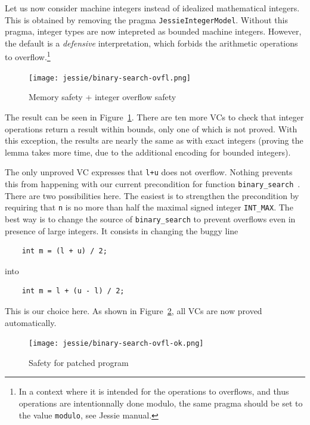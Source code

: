 \documentclass[a4paper,11pt,twoside,openright]{report}
\newcommand{\negtenthspace}{\hspace*{-0.1\linewidth}}
\begin{document}
Let us now consider machine integers instead of idealized mathematical
integers. This is obtained by removing the pragma
\texttt{JessieIntegerModel}.  Without this pragma, integer types are
now intepreted as bounded machine integers. However, the default is a
\emph{defensive} interpretation, which forbids the arithmetic
operations to overflow.\footnote{In a context where it is intended for
  the operations to overflows, and thus operations are intentionnally
  done modulo, the same pragma should be set to the value
  \texttt{modulo}, see Jessie manual.}

\begin{figure}[t]
  \begin{center}
    \negtenthspace\texttt{[image: jessie/binary-search-ovfl.png]}
  \end{center}
  \caption{Memory safety + integer overflow safety}
  \label{fig:ovfl}
  \hrulefill
\end{figure}

The result can be seen in Figure~\ref{fig:ovfl}. There are ten more VCs
to check that integer operations return a result within bounds, only one of
which is not proved. With this exception, the results are nearly the same
as with exact integers (proving the lemma takes more time, due
to the additional encoding for bounded integers).

The only unproved VC expresses that \verb|l+u| does not overflow. 
Nothing prevents this from happening with our current
precondition for function \verb|binary_search|~\cite{Tuch_KN_07}. There are two
possibilities here. The easiest is to strengthen the precondition
by requiring that \verb|n| is no more than half the maximal signed
integer \verb|INT_MAX|. The best way is to change the source of
\verb|binary_search| to prevent overflows even in presence of large
integers. It consists in changing the buggy line

\begin{verbatim}
    int m = (l + u) / 2;
\end{verbatim}

into

\begin{verbatim}
    int m = l + (u - l) / 2;
\end{verbatim}

This is our choice here. As shown in Figure~\ref{fig:ovfl-ok}, all VCs
are now proved automatically.

\begin{figure}[t]
  \begin{center}
    \texttt{[image: jessie/binary-search-ovfl-ok.png]}
  \end{center}
  \caption{Safety for patched program}
  \label{fig:ovfl-ok}
  \hrulefill
\end{figure}
\end{document}
